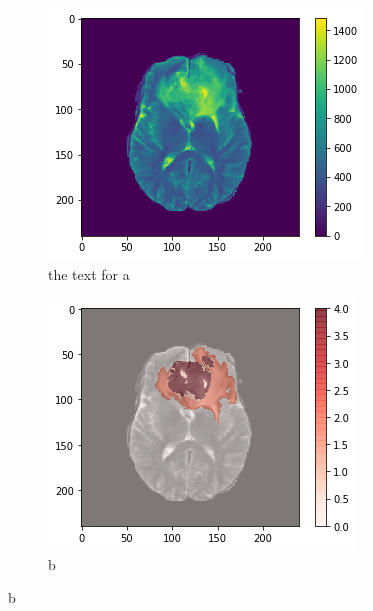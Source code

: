 \begin{figure}[H]
    \centering
    \begin{subfigure}{.33\textwidth}
        \centering
        \includegraphics[width=\linewidth]{chapters/07_brats3d/images/03_t2.png}
        \caption{ the text for a}
    \end{subfigure}%
    \begin{subfigure}{.33\textwidth}
        \centering
        \includegraphics[width=\linewidth]{chapters/07_brats3d/images/07_t2_segment.png}
        \caption{b}
    \end{subfigure}

\end{figure}
